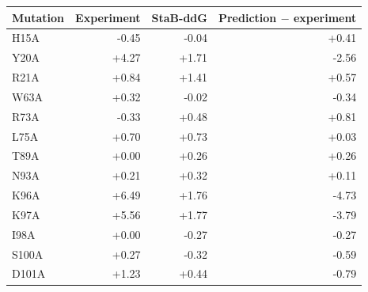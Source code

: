 \begin{tabular}{lrrr}
\toprule
Mutation & Experiment & StaB-ddG & Prediction $-$ experiment \\
\midrule
H15A & -0.45 & -0.04 & +0.41 \\
Y20A & +4.27 & +1.71 & -2.56 \\
R21A & +0.84 & +1.41 & +0.57 \\
W63A & +0.32 & -0.02 & -0.34 \\
R73A & -0.33 & +0.48 & +0.81 \\
L75A & +0.70 & +0.73 & +0.03 \\
T89A & +0.00 & +0.26 & +0.26 \\
N93A & +0.21 & +0.32 & +0.11 \\
K96A & +6.49 & +1.76 & -4.73 \\
K97A & +5.56 & +1.77 & -3.79 \\
I98A & +0.00 & -0.27 & -0.27 \\
S100A & +0.27 & -0.32 & -0.59 \\
D101A & +1.23 & +0.44 & -0.79 \\
\bottomrule
\end{tabular}
